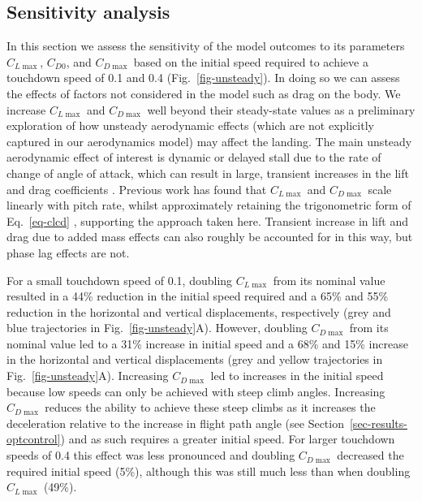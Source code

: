 \subsection{Sensitivity analysis} \label{sec-results-sensitivity}

In this section we assess the sensitivity of the model outcomes to its parameters $C_{L\max}$, $C_{D0}$, and $C_{D\max}$ based on the initial speed required to achieve a touchdown speed of 0.1 and 0.4 (Fig.~\ref{fig-unsteady}). In doing so we can assess the effects of factors not considered in the model such as drag on the body. We increase $C_{L\max}$ and $C_{D\max}$ well beyond their steady-state values as a preliminary exploration of how unsteady aerodynamic effects (which are not explicitly captured in our aerodynamics model) may affect the landing. The main unsteady aerodynamic effect of interest is dynamic or delayed stall due to the rate of change of angle of attack, which can result in large, transient increases in the lift and drag coefficients \cite{stricklandForceCoefficientsNACA00151987,granlundUnsteadyPitchingFlat2013,leishmanPrinciplesHelicopterAerodynamics2017,kieferDynamicStallHigh2022}. Previous work has found that $C_{L\max}$ and $C_{D\max}$ scale linearly with pitch rate, whilst approximately retaining the trigonometric form of Eq.~\ref{eq-clcd} \cite{stricklandForceCoefficientsNACA00151987,granlundUnsteadyPitchingFlat2013}, supporting the approach taken here. Transient increase in lift and drag due to added mass effects \cite{andersenUnsteadyAerodynamicsFluttering2005,wangUnsteadyForcesFlows2004} can also roughly be accounted for in this way, but phase lag effects are not.

For a small touchdown speed of 0.1, doubling $C_{L\max}$ from its nominal value resulted in a 44\% reduction in the initial speed required and a 65\% and 55\% reduction in the horizontal and vertical displacements, respectively (grey and blue trajectories in Fig.~\ref{fig-unsteady}A). However, doubling $C_{D\max}$ from its nominal value led to a 31\% increase in initial speed and a 68\% and 15\% increase in the horizontal and vertical displacements (grey and yellow trajectories in Fig.~\ref{fig-unsteady}A). Increasing $C_{D\max}$ led to increases in the initial speed because low speeds can only be achieved with steep climb angles. Increasing $C_{D\max}$ reduces the ability to achieve these steep climbs as it increases the deceleration relative to the increase in flight path angle (see Section~\ref{sec-results-optcontrol}) and as such requires a greater initial speed. For larger touchdown speeds of 0.4 this effect was less pronounced and doubling $C_{D\max}$ decreased the required initial speed (5\%), although this was still much less than when doubling $C_{L\max}$ (49\%).

